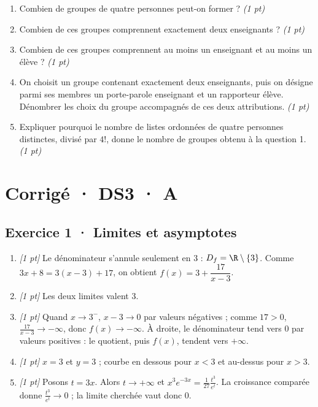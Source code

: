 \begin{enumerate}

\item Combien de groupes de quatre personnes peut-on former ? \hfill\textit{(1 pt)}

\item Combien de ces groupes comprennent exactement deux enseignants ? \hfill\textit{(1 pt)}

\item Combien de ces groupes comprennent au moins un enseignant et au moins un élève ? \hfill\textit{(1 pt)}

\item On choisit un groupe contenant exactement deux enseignants, puis on désigne parmi ses membres un porte-parole enseignant et un rapporteur élève. Dénombrer les choix du groupe accompagnés de ces deux attributions. \hfill\textit{(1 pt)}

\item Expliquer pourquoi le nombre de listes ordonnées de quatre personnes distinctes, divisé par $4!$, donne le nombre de groupes obtenu à la question 1. \hfill\textit{(1 pt)}

\end{enumerate}

\ifmxteacher\mxnewpage

\section*{Corrigé · DS3 · A}\label{cor:4-3}

\subsection*{Exercice 1 · Limites et asymptotes}\begin{enumerate}

\item \textit{[1 pt]} Le dénominateur s'annule seulement en $3$ : $D_f=\R\setminus\{3\}$. Comme $3x+8=3(x-3)+17$, on obtient $f(x)=3+\dfrac{17}{x-3}$.

\item \textit{[1 pt]} Les deux limites valent $3$.

\item \textit{[1 pt]} Quand $x\to 3^-$, $x-3\to0$ par valeurs négatives ; comme $17>0$, $\frac{17}{x-3}\to-\infty$, donc $f(x)\to-\infty$. À droite, le dénominateur tend vers $0$ par valeurs positives : le quotient, puis $f(x)$, tendent vers $+\infty$.

\item \textit{[1 pt]} $x=3$ et $y=3$ ; courbe en dessous pour $x<3$ et au-dessus pour $x>3$.

\item \textit{[1 pt]} Posons $t=3x$. Alors $t\to+\infty$ et $x^3e^{-3x}=\frac{1}{27}\frac{t^3}{e^t}$. La croissance comparée donne $\frac{t^3}{e^t}\to0$ ; la limite cherchée vaut donc $0$.

\end{enumerate}

